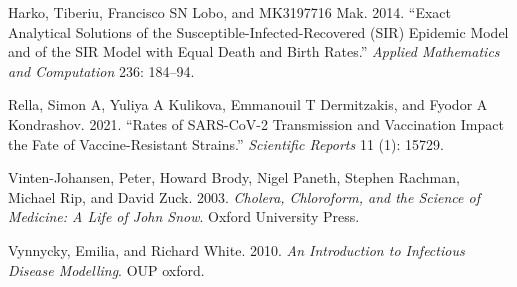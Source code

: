 \documentclass[
  11pt,
  letterpaper,
  DIV=11,
  numbers=noendperiod]{scrartcl}
\newlength{\cslhangindent}
\newlength{\cslentryspacingunit} %
\newenvironment{CSLReferences}[2] %
 {%
  \setlength{\parindent}{0pt}
  \ifodd #1
  \let\oldpar\par
  \def\par{\hangindent=\cslhangindent\oldpar}
  \fi
  \setlength{\parskip}{#2\cslentryspacingunit}
 }%
 {}
\begin{document}
\hypertarget{refs}{}
\begin{CSLReferences}{1}{0}
\leavevmode{}%
Harko, Tiberiu, Francisco SN Lobo, and MK3197716 Mak. 2014. {``Exact
Analytical Solutions of the Susceptible-Infected-Recovered (SIR)
Epidemic Model and of the SIR Model with Equal Death and Birth Rates.''}
\emph{Applied Mathematics and Computation} 236: 184--94.

\leavevmode{}%
Rella, Simon A, Yuliya A Kulikova, Emmanouil T Dermitzakis, and Fyodor A
Kondrashov. 2021. {``Rates of SARS-CoV-2 Transmission and Vaccination
Impact the Fate of Vaccine-Resistant Strains.''} \emph{Scientific
Reports} 11 (1): 15729.

\leavevmode{}%
Vinten-Johansen, Peter, Howard Brody, Nigel Paneth, Stephen Rachman,
Michael Rip, and David Zuck. 2003. \emph{Cholera, Chloroform, and the
Science of Medicine: A Life of John Snow}. Oxford University Press.

\leavevmode{}%
Vynnycky, Emilia, and Richard White. 2010. \emph{An Introduction to
Infectious Disease Modelling}. OUP oxford.

\end{CSLReferences}
\end{document}
